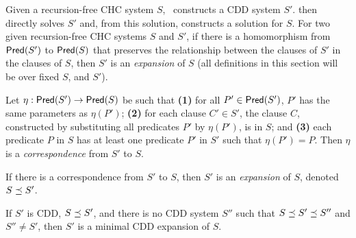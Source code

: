 Given a recursion-free CHC system $S$, \shara~constructs a CDD system
$S'$.
%
\sys then directly solves $S'$ and, from this solution, constructs a solution
for $S$.
For two given recursion-free CHC systems $S$ and $S'$, if
there is a homomorphism from $\mathsf{Pred}( S' )$ to $\mathsf{Pred}( S )$ that
preserves the relationship between the clauses of $S'$ in
the clauses of $S$, then $S'$ is an \emph{expansion} of
$S$ (all definitions in this section will be over fixed
$S$, and $S'$).
\begin{defn}
  \label{defn:expansion}
  Let $\eta : \mathsf{Pred}( S' ) \to \mathsf{Pred}( S )$ be such that
  \textbf{(1)} for all $P' \in \mathsf{Pred}( S' )$, $P'$ has the
  same parameters as $\eta(P')$;
  \textbf{(2)} for each clause $C' \in S'$, the clause $C$, constructed
  by substituting all predicates $P'$ by $\eta(P')$, is in $S$; and
  \textbf{(3)} each predicate $P$ in $S$ has at least one predicate
  $P'$ in $S'$ such that $\eta(P') = P$.
  Then $\eta$ is a \emph{correspondence} from $S'$ to $S$.
\end{defn}
%
If there is a correspondence from $S'$ to $S$, then $S'$ is an \emph{expansion}
of $S$, denoted $S \preceq S'$.

%
\begin{defn}
  \label{defn:min-expansion}
  If $S'$ is CDD, $S \preceq S'$, and there is no CDD system $S''$ such that $S \preceq S' \preceq S''$ and
  $S'' \neq S'$, then $S'$ is a minimal CDD expansion of $S$.
\end{defn}

